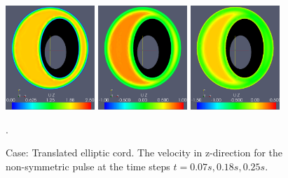 \begin{figure}\begin{center}
\includegraphics[width=0.3\textwidth]{chapters/hentschel/pdf/pulse_f1_08_elliptic_eccentric_sysmax_nmb7.pdf}
\includegraphics[width=0.3\textwidth]{chapters/hentschel/pdf/pulse_f1_08_elliptic_eccentric_sysdia_nmb18.pdf}
\includegraphics[width=0.3\textwidth]{chapters/hentschel/pdf/pulse_f1_08_elliptic_eccentric_diamin1_nmb25.pdf}
\caption{Case: Translated elliptic cord. The velocity in z-direction for the non-symmetric pulse at the time steps $t=0.07s, 0.18s, 0.25s$.}
\label{fig:case3b}.
\end{center}\end{figure}


